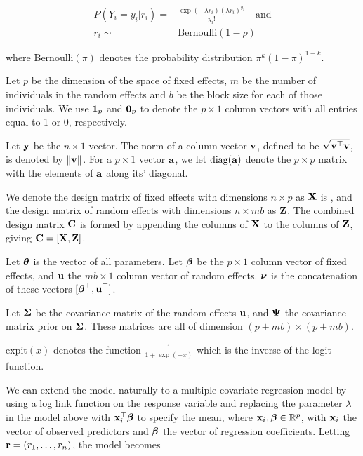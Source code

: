 \begin{equation}
\label{eq:zero_infl_second_param}
\begin{array}{rl}
	P(Y_i=y_i|r_i) = & \frac{\exp(-\lambda r_i)(\lambda r_i)^{y_i}}{y_i!} \quad \mbox{and} \\
	r_i \sim & \mbox{Bernoulli}(1-\rho)
\end{array}
\end{equation}

where $\text{Bernoulli}(\pi)$ denotes the probability distribution $\pi^k (1 - \pi)^{1-k}$.

Let $p$ be the dimension of the space of fixed effects, $m$ be the number of individuals in the random effects
and $b$ be the block size for each of those individuals. We use ${\bf 1}_p$ and ${\bf 0}_p$ to denote the $p
\times 1$ column vectors with all entries equal to 1 or 0, respectively.

Let ${\bf y}$ be the $n \times 1$ vector. The norm of a column vector ${\bf v}$, defined to be $\sqrt{{\bf v}^\top {\bf v}}$,
is  denoted by $\|{\bf v}\|$. For a $p \times 1$ vector ${\bf a}$, we let $\text{diag}{({\bf a})}$ denote the $p \times p$
matrix with the elements of ${\bf a}$ along its' diagonal.

We denote the design matrix of fixed effects with dimensions $n \times p$ as ${\bf X}$ is , and the design matrix
of random  effects with dimensions $n \times m b$ as ${\bf Z}$. The combined design matrix ${\bf C}$ is formed by
appending the columns of ${\bf X}$ to the columns of ${\bf Z}$, giving ${\bf C} = [ {\bf X}, {\bf Z} ]$.

Let ${\boldsymbol \theta}$ is the vector of all parameters.
Let ${\boldsymbol \beta}$ be the $p \times 1$ column vector of fixed
effects, and ${\bf u}$ the $m b \times 1$ column vector of random effects. ${\boldsymbol \nu}$ is the
concatenation of these vectors $[{\boldsymbol \beta}^\top, {\bf u}^\top]$.

Let ${\boldsymbol \Sigma}$ be the covariance matrix of the random effects ${\bf u}$,
and 
${\boldsymbol \Psi}$ the covariance matrix prior on ${\boldsymbol \Sigma}$.
These matrices are all of dimension $(p + m b) \times (p + m b)$.

$\text{expit}(x)$ denotes the function $\tfrac{1}{1 + \exp(-x)}$ which is the inverse of the logit
function.

We can extend the model naturally to a multiple covariate regression model by using a log link function on the
response variable and replacing the parameter $\lambda$ in the model above with ${\bf x}_i^\top {\boldsymbol\beta}$ to specify
the mean, where ${\bf x}_i,{\boldsymbol \beta} \in {\mathbb{R}}^p$, with ${\bf x}_i$ the vector of observed predictors and ${\boldsymbol \beta}$ the
vector of regression coefficients. Letting ${\bf r} = (r_1,\ldots,r_n)$, the model becomes

